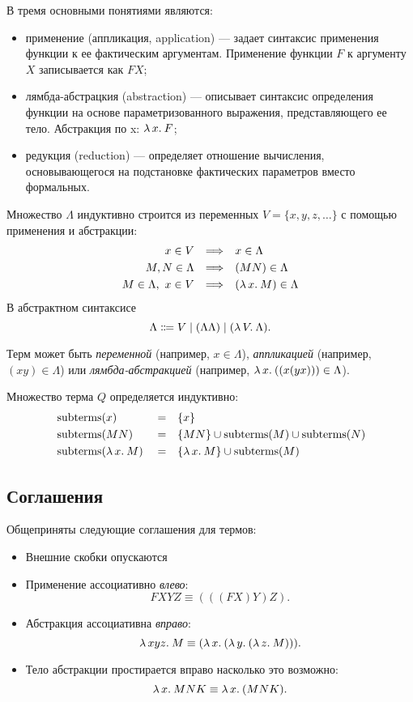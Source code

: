 \documentclass[11pt,a4paper]{article}
\begin{document}
\noindent
В  тремя основными понятиями являются:
\begin{itemize}
	\item применение (аппликация, application) --- задает синтаксис применения функции к ее фактическим аргументам.
		Применение функции $ F$ к аргументу $ X$ записывается как $ FX$;
	\item лямбда-абстрацкия (abstraction) --- описывает синтаксис определения функции на основе параметризованного выражения, представляющего ее тело. Абстракция по x: $ \lambda\,{x}.\:{F}$;
	\item редукция (reduction) --- определяет отношение вычисления, основывающегося на подстановке фактических параметров вместо формальных.
\end{itemize}
\begin{defn}
	Множество  $ \Lambda$ индуктивно строится из переменных  $ V = \{x, y, z, \ldots \}$ с помощью применения и абстракции:
\[
\begin{aligned}
	x \in V && \Longrightarrow &&& x \in \Lambda \\
	M, N \in \Lambda && \Longrightarrow &&& (MN) \in \Lambda \\
	M \in \Lambda, ~  x \in  V && \Longrightarrow &&& (\lambda\,{x}.\:{M}) \in \Lambda
\end{aligned}
\]
В абстрактном синтаксисе 
\[
	\Lambda \Coloneqq V \mid (\Lambda \Lambda) \mid (\lambda\,{V}.\:{\Lambda})
.\] 
\end{defn}
Терм может быть \textit{переменной} (например, $ x \in \Lambda$), \textit{аппликацией} (например, $ (xy) \in \Lambda$) или \textit{лямбда-абстракцией} (например, $ \lambda\,{x}.\:{((x(yx)))} \in  \Lambda$).

\begin{defn}[Подтермы]
	Множество  терма $ Q$ определяется индуктивно:
	\[
	\begin{aligned}
		&\operatorname{subterms}(x) && = && \{x\} \\
		&\operatorname{subterms}(MN) && = && \{MN\} \cup \operatorname{subterms}(M) \cup \operatorname{subterms}(N) \\
		&\operatorname{subterms}(\lambda\,{x}.\:{M}) && = && \{\lambda\,{x}.\:{M}\} \cup \operatorname{subterms}(M)
	\end{aligned}
	\]
\end{defn}


\subsection{Соглашения}
Общеприняты следующие соглашения для термов:
\begin{itemize}
	\item Внешние скобки опускаются
	\item Применение  ассоциативно \textit{влево}:
		\[
			FXYZ \equiv (((FX)Y)Z)
		.\] 
	\item Абстракция ассоциативна \textit{вправо}:
		\[
			\lambda\,{x y z}.\:{M} \equiv (\lambda\,{x}.\:{(\lambda\,{y}.\:{(\lambda\,{z}.\:{M})})})
		.\] 
	\item Тело абстракции простирается вправо насколько это возможно:
		\[
			\lambda\,{x}.\:{MNK} \equiv \lambda\,{x}.\:{(MNK)}
		.\] 
\end{itemize}
\end{document}
